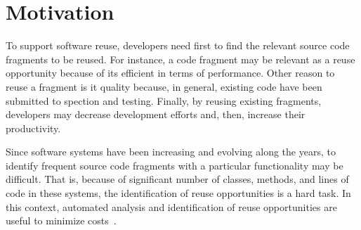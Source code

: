 \begin{comment}

In this dissertation, we propose a method for identification  of reuse opportunities called JReuse. Considering a set of software systems, JReuse aims to identify similarly named classes and methods from the systems based on lexical analysis. From the most frequent classes, JReuse analyzes the methods of these classes to identify similarly named methods. The dissertation also presents a prototype tool that supports the proposed method. JReuse provides a list of classes and methods recommended as reuse opportunities. This list may guide developers in the use of existing entities that are common in systems from a given domain. %

\newpage
We conducted an evaluation of our method in two steps.  First, we performed an empirical study conducted in controlled environment with 72 software systems. These systems were collected from GitHub and belong to four different software domains: accounting, restaurant, hospital, and e-commerce. Second, we conducted  a survey with experienced developers from two of the four domains, namely, e-commerce and hospital. We evaluated only these two domains because of the low percentage of responses for the other domains. With respect to the first step, we we observe that JReuse is able to identify reuse opportunities using naming similarity analysis for classes and methods. Regarding the second step, participants from the survey agree that JReuse provides relevant classes for the analyzed domains as reuse opportunities.
\end{comment}

\section{Motivation}
\label{sec:motivacao}

To support software reuse, developers need first to find the relevant source code fragments to be reused. For instance, a code fragment may be relevant as a reuse opportunity because of its efficient in terms of performance. Other reason to reuse a fragment is it quality because, in general, existing code have been submitted to spection and testing. Finally, by reusing existing fragments, developers may decrease development efforts and, then, increase their productivity.

Since software systems have been increasing and evolving along the years, to identify frequent source code fragments with a particular functionality may be difficult. That is, because of significant number of classes, methods, and lines of code in these systems, the identification of reuse opportunities is a hard task. In this context, automated analysis and identification of reuse opportunities are useful to minimize costs~\citep{Ye:2002}.

